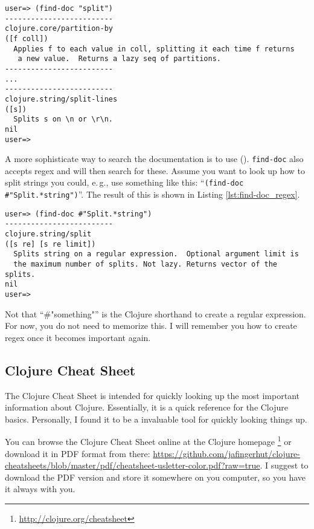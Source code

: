 \begin{lstlisting}[label=lst:find-doc_string, caption=Search the Documentation for a String]
user=> (find-doc "split")
-------------------------
clojure.core/partition-by
([f coll])
  Applies f to each value in coll, splitting it each time f returns
   a new value.  Returns a lazy seq of partitions.
-------------------------
...
-------------------------
clojure.string/split-lines
([s])
  Splits s on \n or \r\n.
nil
user=> 
\end{lstlisting}

A more sophisticate way to search the documentation is to use  ().
\texttt{find-doc} also accepts regex and will then search for these.
Assume you want to look up how to split strings you could, e.\,g., use something like this: ``\texttt{(find-doc \#"Split.*string")}''.
The result of this is shown in Listing \vref{lst:find-doc_regex}.

\begin{lstlisting}[label=lst:find-doc_regex, caption=Search the Documentation via Regex]
user=> (find-doc #"Split.*string")
-------------------------
clojure.string/split
([s re] [s re limit])
  Splits string on a regular expression.  Optional argument limit is
  the maximum number of splits. Not lazy. Returns vector of the splits.
nil
user=> 
\end{lstlisting}

Not that ``\#"something"'' is the Clojure shorthand to create a regular expression.
For now, you do not need to memorize this.
I will remember you how to create regex once it becomes important again.

\subsection{Clojure Cheat Sheet}
The Clojure Cheat Sheet is intended for quickly looking up the most important information about Clojure.
Essentially, it is a quick reference for the Clojure basics.
Personally, I found it to be a invaluable tool for quickly looking things up.

You can browse the Clojure Cheat Sheet online at the Clojure homepage \footnote{\url{http://clojure.org/cheatsheet}} or download it in PDF format from there: \url{https://github.com/jafingerhut/clojure-cheatsheets/blob/master/pdf/cheatsheet-usletter-color.pdf?raw=true}.
I suggest to download the PDF version and store it somewhere on you computer, so you have it always with you.


